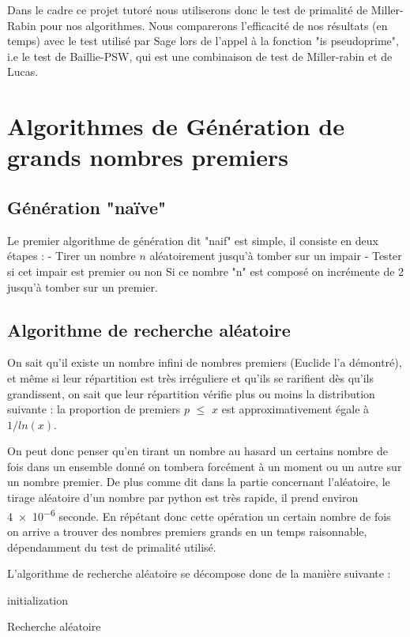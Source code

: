 \documentclass[a4paper,11pt]{article}
\begin{document}
Dans le cadre ce projet tutoré nous utiliserons donc le test de primalité de Miller-Rabin pour nos algorithmes. Nous comparerons l'efficacité de nos résultats (en temps) avec le test utilisé par Sage lors de l'appel à la fonction "is pseudoprime", i.e le test de Baillie-PSW, qui est une combinaison de test de Miller-rabin et de Lucas.

\section{Algorithmes de Génération de grands nombres premiers}

\subsection{Génération "naïve"}

Le premier algorithme de génération dit "naif" est simple, il consiste en deux étapes :
    - Tirer un nombre $n$ aléatoirement jusqu'à tomber sur un impair
    - Tester si cet impair est premier ou non
        Si ce nombre "n" est composé on incrémente de 2 jusqu'à tomber sur un premier.
    
\subsection{Algorithme de recherche aléatoire }
On sait qu'il existe un nombre infini de nombres premiers (Euclide l'a démontré),  et même si leur répartition est très irréguliere et qu'ils se rarifient dès qu'ils grandissent, on sait que leur répartition vérifie plus ou moins la distribution suivante :
la proportion de premiers $p$ $\leq$ $x$ est approximativement égale à $1/ln(x)$.

On peut donc penser qu'en tirant un nombre au hasard un certains nombre de fois dans un ensemble donné on tombera forcément à un moment ou un autre sur un nombre premier.
De plus comme dit dans la partie concernant l'aléatoire, le tirage aléatoire d'un nombre par python est très rapide, il prend environ  \num{4e-6} seconde. En répétant donc cette opération un certain nombre de fois on arrive a trouver des nombres premiers grands en un temps raisonnable, dépendamment du test de primalité utilisé. 

L'algorithme de recherche aléatoire se décompose donc de la manière suivante : 


\begin{algorithm}[H]
\SetAlgoLined
{}
 initialization\;
 \caption{Recherche aléatoire}
\end{algorithm}
\end{document}
